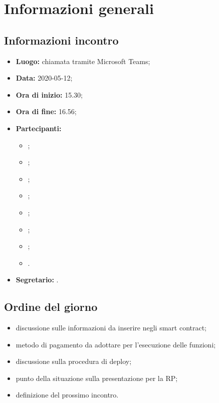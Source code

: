 \section{Informazioni generali}
\subsection{Informazioni incontro}
\begin{itemize}
	\item \textbf{Luogo:} chiamata tramite Microsoft Teams; 
	\item \textbf{Data:} 2020-05-12;
	\item \textbf{Ora di inizio:} 15.30; 
	\item \textbf{Ora di fine:} 16.56; 
	\item \textbf{Partecipanti:}
		\begin{itemize}
			\item \VB; 
			\item \LB; 
			\item \NF; 
			\item \EG; 
			\item \FJ; 
			\item \MP; 
			\item \AS; 
			\item \AZ.
		\end{itemize}
	\item \textbf{Segretario:} \NF. 
\end{itemize}

\subsection{Ordine del giorno}
\begin{itemize}
	\item discussione sulle informazioni da inserire negli smart contract;
	\item metodo di pagamento da adottare per l'esecuzione delle funzioni;
	\item discussione sulla procedura di deploy; 
	\item punto della situazione sulla presentazione per la RP; 
	\item definizione del prossimo incontro.
\end{itemize}
